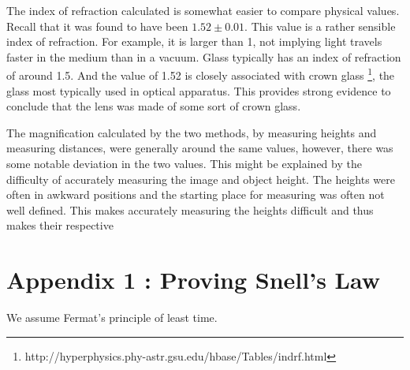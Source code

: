 \documentclass[]{article}
\begin{document}
The index of refraction calculated is somewhat easier to compare physical values. Recall that it was found to have been \(1.52 \pm 0.01\). This value is a rather sensible index of refraction. For example, it is larger than 1, not implying light travels faster in the medium than in a vacuum. Glass typically has an index of refraction of around 1.5. And the value of 1.52 is closely associated with crown glass \footnote{http://hyperphysics.phy-astr.gsu.edu/hbase/Tables/indrf.html}, the glass most typically used in optical apparatus. This provides strong evidence to conclude that the lens was made of some sort of crown glass.

The magnification calculated by the two methods, by measuring heights and measuring distances, were generally around the same values, however, there was some notable deviation in the two values. This might be explained by the difficulty of accurately measuring the image and object height. The heights were often in awkward positions and the starting place for measuring was often not well defined. This makes accurately measuring the heights difficult and thus makes their respective 
\pagebreak
\section*{Appendix 1 : Proving Snell's Law}
We assume Fermat's principle of least time.
\end{document}
